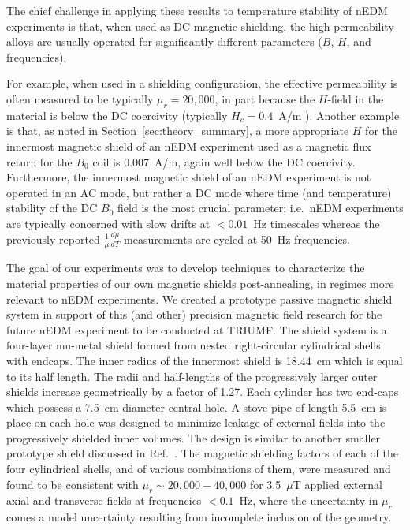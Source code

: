 \documentclass[review]{elsarticle}
\begin{document}
The chief challenge in applying these results to temperature stability
of nEDM experiments is that, when used as DC magnetic shielding, the
high-permeability alloys are usually operated for significantly
different parameters ($B$, $H$, and frequencies).

For example, when used in a shielding configuration, the effective
permeability is often measured to be typically $\mu_r=20,000$, in part
because the $H$-field in the material is below the DC coercivity
(typically $H_c=0.4$~A/m \cite{bib:kruppvdm}).  Another example is
that, as noted in Section~\ref{sec:theory_summary}, a more appropriate $H$ for
the innermost magnetic shield of an nEDM experiment used as a magnetic
flux return for the $B_0$ coil is 0.007~A/m, again well below the DC
coercivity.  Furthermore, the innermost magnetic shield of an nEDM
experiment is not operated in an AC mode, but rather a DC mode where
time (and temperature) stability of the DC $B_0$ field is the most
crucial parameter; i.e.~nEDM experiments are typically concerned with
slow drifts at $<0.01$~Hz timescales whereas the previously reported
$\frac{1}{\mu}\frac{d\mu}{dT}$ measurements are cycled at 50~Hz
frequencies.


The goal of our experiments was to develop techniques to characterize
the material properties of our own magnetic shields post-annealing, in
regimes more relevant to nEDM experiments.  We created a prototype
passive magnetic shield system in support of this (and other)
precision magnetic field research for the future nEDM experiment to be
conducted at TRIUMF.  The shield system is a four-layer mu-metal
shield formed from nested right-circular cylindrical shells with
endcaps.  The inner radius of the innermost shield is 18.44~cm which
is equal to its half length. The radii and half-lengths of the
progressively larger outer shields increase geometrically by a factor
of 1.27.  Each cylinder has two end-caps which possess a 7.5~cm
diameter central hole.  A stove-pipe of length 5.5~cm is place on each
hole was designed to minimize leakage of external fields into the
progressively shielded inner volumes.  The design is similar to
another smaller prototype shield discussed in
Ref.~\cite{bib:nmorpaper}.  The magnetic shielding factors of each of
the four cylindrical shells, and of various combinations of them, were
measured and found to be consistent with $\mu_r\sim 20,000-40,000$ for
3.5~$\mu$T applied external axial and transverse fields at frequencies
$<0.1$~Hz, where the uncertainty in $\mu_r$ comes a model uncertainty
resulting from incomplete inclusion of the geometry.
\end{document}
